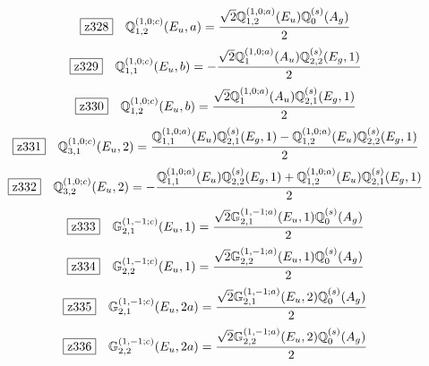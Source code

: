 \documentclass[fleqn,10pt,landscape]{jsarticle}
\begin{document}
\begin{dmath*}
\hspace*{3mm}\fbox{z328}\quad \mathbb{Q}_{1,2}^{(1,0;c)}(E_{u},a)=\frac{\sqrt{2} \mathbb{Q}_{1,2}^{(1,0;a)}(E_{u}) \mathbb{Q}_{0}^{(s)}(A_{g})}{2}
\end{dmath*}
\begin{dmath*}
\hspace*{3mm}\fbox{z329}\quad \mathbb{Q}_{1,1}^{(1,0;c)}(E_{u},b)=- \frac{\sqrt{2} \mathbb{Q}_{1}^{(1,0;a)}(A_{u}) \mathbb{Q}_{2,2}^{(s)}(E_{g},1)}{2}
\end{dmath*}
\begin{dmath*}
\hspace*{3mm}\fbox{z330}\quad \mathbb{Q}_{1,2}^{(1,0;c)}(E_{u},b)=\frac{\sqrt{2} \mathbb{Q}_{1}^{(1,0;a)}(A_{u}) \mathbb{Q}_{2,1}^{(s)}(E_{g},1)}{2}
\end{dmath*}
\begin{dmath*}
\hspace*{3mm}\fbox{z331}\quad \mathbb{Q}_{3,1}^{(1,0;c)}(E_{u},2)=\frac{\mathbb{Q}_{1,1}^{(1,0;a)}(E_{u}) \mathbb{Q}_{2,1}^{(s)}(E_{g},1) - \mathbb{Q}_{1,2}^{(1,0;a)}(E_{u}) \mathbb{Q}_{2,2}^{(s)}(E_{g},1)}{2}
\end{dmath*}
\begin{dmath*}
\hspace*{3mm}\fbox{z332}\quad \mathbb{Q}_{3,2}^{(1,0;c)}(E_{u},2)=- \frac{\mathbb{Q}_{1,1}^{(1,0;a)}(E_{u}) \mathbb{Q}_{2,2}^{(s)}(E_{g},1) + \mathbb{Q}_{1,2}^{(1,0;a)}(E_{u}) \mathbb{Q}_{2,1}^{(s)}(E_{g},1)}{2}
\end{dmath*}
\begin{dmath*}
\hspace*{3mm}\fbox{z333}\quad \mathbb{G}_{2,1}^{(1,-1;c)}(E_{u},1)=\frac{\sqrt{2} \mathbb{G}_{2,1}^{(1,-1;a)}(E_{u},1) \mathbb{Q}_{0}^{(s)}(A_{g})}{2}
\end{dmath*}
\begin{dmath*}
\hspace*{3mm}\fbox{z334}\quad \mathbb{G}_{2,2}^{(1,-1;c)}(E_{u},1)=\frac{\sqrt{2} \mathbb{G}_{2,2}^{(1,-1;a)}(E_{u},1) \mathbb{Q}_{0}^{(s)}(A_{g})}{2}
\end{dmath*}
\begin{dmath*}
\hspace*{3mm}\fbox{z335}\quad \mathbb{G}_{2,1}^{(1,-1;c)}(E_{u},2a)=\frac{\sqrt{2} \mathbb{G}_{2,1}^{(1,-1;a)}(E_{u},2) \mathbb{Q}_{0}^{(s)}(A_{g})}{2}
\end{dmath*}
\begin{dmath*}
\hspace*{3mm}\fbox{z336}\quad \mathbb{G}_{2,2}^{(1,-1;c)}(E_{u},2a)=\frac{\sqrt{2} \mathbb{G}_{2,2}^{(1,-1;a)}(E_{u},2) \mathbb{Q}_{0}^{(s)}(A_{g})}{2}
\end{dmath*}
\end{document}
